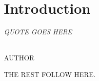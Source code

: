 \chapter{Introduction}\label{chp:chp1}

\begin{flushright}
  {\em QUOTE GOES HERE }\\

\ \

\normalsize
{AUTHOR}  
\end{flushright}



THE REST FOLLOW HERE. 


